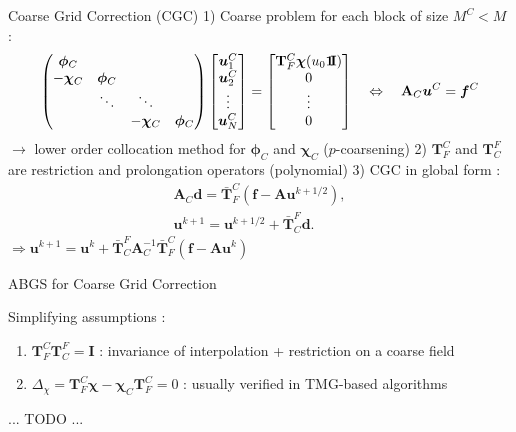 \documentclass[11pt,aspectratio=43]{beamer}
\newcommand{\ones}{\mbox{1\hspace{-0.2em}I}}
\newcommand{\matr}[1]{\mathbf{#1}}
\newcommand{\vect}[1]{\boldsymbol{#1}}
\newcommand{\Imat}{\matr{I}}
\newcommand{\uvect}{\vect{u}}
\newcommand{\TFtoCBar}{\bar{\matr{T}}_F^C}
\newcommand{\TCtoFBar}{\bar{\matr{T}}_C^F}
\newcommand{\TFtoC}{\matr{T}_F^C}
\newcommand{\TCtoF}{\matr{T}_C^F}
\newcommand{\AMat}{\matr{A}}
\newcommand{\chiOp}{\bm{\chi}}
\newcommand{\CoarseId}{C}
\newcommand{\uCoarse}{\vect{u}^\CoarseId}
\newcommand{\ACoarse}{\matr{A}_\CoarseId}
\newcommand{\chiCoarse}{\bm{\chi}_\CoarseId}
\newcommand{\phiCoarse}{\bm{\phi}_\CoarseId}
\begin{document}
\begin{frame}{Coarse Grid Correction (CGC)}
	1) Coarse problem for each block of size $M^C < M$ :
	\begin{equation*}\label{eq:globalCoarseProblem}
		\begin{pmatrix}
			\phiCoarse & & &\\
			-\chiCoarse & \phiCoarse & &\\
			& \ddots & \ddots &\\
			& & -\chiCoarse & \phiCoarse
		\end{pmatrix}
		\begin{bmatrix}
			\uCoarse_{1}\\\uCoarse_{2}\\\vdots\\\uCoarse_{N}
		\end{bmatrix}
		=
		\begin{bmatrix}
			\TFtoC\chiOp(u_0\vect{\ones})\\0\\\vdots\\0
		\end{bmatrix}
		\quad \Leftrightarrow \quad
		\ACoarse\uCoarse = \vect{f}^\CoarseId
	\end{equation*}
	$\rightarrow$ lower order collocation method for $\phiCoarse$ and $\chiCoarse$ ($p$-coarsening)\vskip10pt
	2) $\TFtoC$ and $\TCtoF$ are restriction and prolongation operators (polynomial)\vskip10pt
	3) CGC in global form :
	\begin{gather*}
		\ACoarse\vect{d} = \TFtoCBar (\vect{f}-\AMat\uvect^{k+1/2}),\label{eq:PFASST-directCGC}\\
		\uvect^{k+1} = \uvect^{k+1/2} + \TCtoFBar\vect{d}.\label{eq:PFASST-prolong}
	\end{gather*}\vskip6pt
	\centering
	$\Rightarrow \uvect^{k+1} = \uvect^{k} + \TCtoFBar \ACoarse^{-1} \TFtoCBar
	(\vect{f}-\AMat\uvect^k)$\vspace*{-10pt}
\end{frame}

\begin{frame}{ABGS for Coarse Grid Correction}
	
	Simplifying assumptions :
	\begin{enumerate}
		\item $\TFtoC\TCtoF = \Imat$ : invariance of interpolation + restriction on a coarse field
		\item $\Delta_\chi = \TFtoC\bm{\chi} - \bm{\chi}_C \TFtoC = 0$ : usually verified in TMG-based algorithms
	\end{enumerate}\vskip10pt
	... TODO ...
\end{frame}
\end{document}

